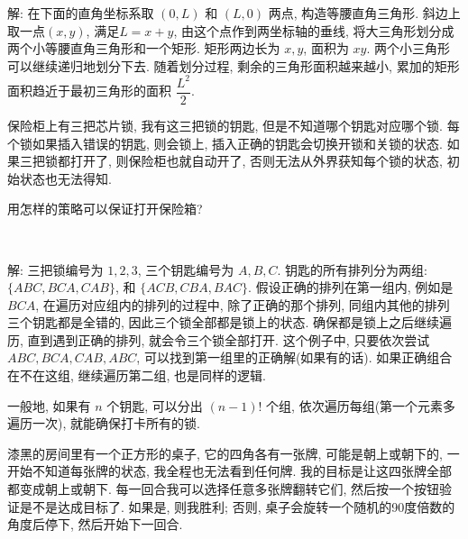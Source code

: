 解: 在下面的直角坐标系取 $(0,L)$ 和 $(L,0)$ 两点, 构造等腰直角三角形. 斜边上取一点$(x,y)$, 满足$L=x+y$, 由这个点作到两坐标轴的垂线, 将大三角形划分成两个小等腰直角三角形和一个矩形. 矩形两边长为 $x,y$, 面积为 $xy$. 两个小三角形可以继续递归地划分下去. 随着划分过程, 剩余的三角形面积越来越小, 累加的矩形面积趋近于最初三角形的面积 $\dfrac{L^2}{2}$.
\begin{figure*}[htbp]
\centering
{}
\end{figure*}


\newpage
保险柜上有三把芯片锁, 我有这三把锁的钥匙, 但是不知道哪个钥匙对应哪个锁. 每个锁如果插入错误的钥匙, 则会锁上, 插入正确的钥匙会切换开锁和关锁的状态. 如果三把锁都打开了, 则保险柜也就自动开了, 否则无法从外界获知每个锁的状态, 初始状态也无法得知.

用怎样的策略可以保证打开保险箱?

~

解: 三把锁编号为 $1,2,3$, 三个钥匙编号为 $A, B, C$. 钥匙的所有排列分为两组: $\{ABC, BCA, CAB\}$, 和 $\{ACB, CBA, BAC\}$. 假设正确的排列在第一组内, 例如是 $BCA$, 在遍历对应组内的排列的过程中, 除了正确的那个排列, 同组内其他的排列三个钥匙都是全错的, 因此三个锁全部都是锁上的状态. 确保都是锁上之后继续遍历, 直到遇到正确的排列, 就会令三个锁全部打开. 这个例子中, 只要依次尝试 $ABC, BCA, CAB, ABC$, 可以找到第一组里的正确解(如果有的话). 如果正确组合在不在这组, 继续遍历第二组, 也是同样的逻辑.

一般地, 如果有 $n$ 个钥匙, 可以分出 $(n-1)!$ 个组, 依次遍历每组(第一个元素多遍历一次), 就能确保打卡所有的锁.


\newpage
漆黑的房间里有一个正方形的桌子, 它的四角各有一张牌, 可能是朝上或朝下的, 一开始不知道每张牌的状态, 我全程也无法看到任何牌. 我的目标是让这四张牌全部都变成朝上或朝下. 每一回合我可以选择任意多张牌翻转它们, 然后按一个按钮验证是不是达成目标了. 如果是, 则我胜利; 否则, 桌子会旋转一个随机的90度倍数的角度后停下, 然后开始下一回合.

